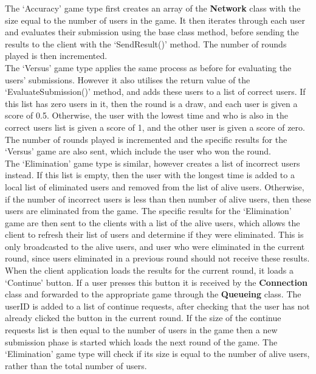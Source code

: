 \documentclass{article}
\begin{document}
The `Accuracy' game type first creates an array of the \textbf{Network} class with the size equal to the number of users in the game. It then iterates through each user and evaluates their submission using the base class method, before sending the results to the client with the `SendResult()' method. The number of rounds played is then incremented. \\

The `Versus' game type applies the same process as before for evaluating the users' submissions. However it also utilises the return value of the `EvaluateSubmission()' method, and adds these users to a list of correct users. If this list has zero users in it, then the round is a draw, and each user is given a score of 0.5. Otherwise, the user with the lowest time and who is also in the correct users list is given a score of 1, and the other user is given a score of zero. The number of rounds played is incremented and the specific results for the `Versus' game are also sent, which include the user who won the round. \\

The `Elimination' game type is similar, however creates a list of incorrect users instead. If this list is empty, then the user with the longest time is added to a local list of eliminated users and removed from the list of alive users. Otherwise, if the number of incorrect users is less than then number of alive users, then these users are eliminated from the game. The specific results for the `Elimination' game are then sent to the clients with a list of the alive users, which allows the client to refresh their list of users and determine if they were eliminated. This is only broadcasted to the alive users, and user who were eliminated in the current round, since users eliminated in a previous round should not receive these results. \\

When the client application loads the results for the current round, it loads a `Continue' button. If a user presses this button it is received by the \textbf{Connection} class and forwarded to the appropriate game through the \textbf{Queueing} class. The userID is added to a list of continue requests, after checking that the user has not already clicked the button in the current round. If the size of the continue requests list is then equal to the number of users in the game then a new submission phase is started which loads the next round of the game. The `Elimination' game type will check if its size is equal to the number of alive users, rather than the total number of users.
\end{document}
